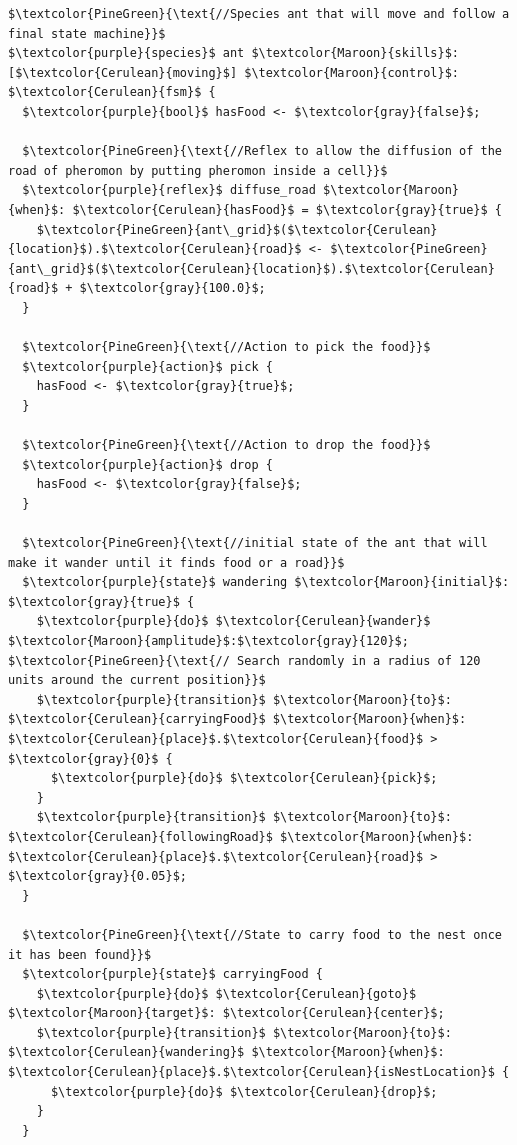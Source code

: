 \documentclass[12pt, a4paper]{memoir} %
\begin{document}
			\begin{lstlisting}[mathescape,caption=Finite State Machine exemple.,label=code:fsm]
$\textcolor{PineGreen}{\text{//Species ant that will move and follow a final state machine}}$
$\textcolor{purple}{species}$ ant $\textcolor{Maroon}{skills}$: [$\textcolor{Cerulean}{moving}$] $\textcolor{Maroon}{control}$: $\textcolor{Cerulean}{fsm}$ {
  $\textcolor{purple}{bool}$ hasFood <- $\textcolor{gray}{false}$;

  $\textcolor{PineGreen}{\text{//Reflex to allow the diffusion of the road of pheromon by putting pheromon inside a cell}}$
  $\textcolor{purple}{reflex}$ diffuse_road $\textcolor{Maroon}{when}$: $\textcolor{Cerulean}{hasFood}$ = $\textcolor{gray}{true}$ {
    $\textcolor{PineGreen}{ant\_grid}$($\textcolor{Cerulean}{location}$).$\textcolor{Cerulean}{road}$ <- $\textcolor{PineGreen}{ant\_grid}$($\textcolor{Cerulean}{location}$).$\textcolor{Cerulean}{road}$ + $\textcolor{gray}{100.0}$;
  }

  $\textcolor{PineGreen}{\text{//Action to pick the food}}$
  $\textcolor{purple}{action}$ pick {
    hasFood <- $\textcolor{gray}{true}$;
  }

  $\textcolor{PineGreen}{\text{//Action to drop the food}}$
  $\textcolor{purple}{action}$ drop {
    hasFood <- $\textcolor{gray}{false}$;
  }

  $\textcolor{PineGreen}{\text{//initial state of the ant that will make it wander until it finds food or a road}}$
  $\textcolor{purple}{state}$ wandering $\textcolor{Maroon}{initial}$: $\textcolor{gray}{true}$ {
    $\textcolor{purple}{do}$ $\textcolor{Cerulean}{wander}$ $\textcolor{Maroon}{amplitude}$:$\textcolor{gray}{120}$; $\textcolor{PineGreen}{\text{// Search randomly in a radius of 120 units around the current position}}$
    $\textcolor{purple}{transition}$ $\textcolor{Maroon}{to}$: $\textcolor{Cerulean}{carryingFood}$ $\textcolor{Maroon}{when}$: $\textcolor{Cerulean}{place}$.$\textcolor{Cerulean}{food}$ > $\textcolor{gray}{0}$ {
      $\textcolor{purple}{do}$ $\textcolor{Cerulean}{pick}$;
    }
    $\textcolor{purple}{transition}$ $\textcolor{Maroon}{to}$: $\textcolor{Cerulean}{followingRoad}$ $\textcolor{Maroon}{when}$: $\textcolor{Cerulean}{place}$.$\textcolor{Cerulean}{road}$ > $\textcolor{gray}{0.05}$;
  }

  $\textcolor{PineGreen}{\text{//State to carry food to the nest once it has been found}}$
  $\textcolor{purple}{state}$ carryingFood {
    $\textcolor{purple}{do}$ $\textcolor{Cerulean}{goto}$ $\textcolor{Maroon}{target}$: $\textcolor{Cerulean}{center}$;
    $\textcolor{purple}{transition}$ $\textcolor{Maroon}{to}$: $\textcolor{Cerulean}{wandering}$ $\textcolor{Maroon}{when}$: $\textcolor{Cerulean}{place}$.$\textcolor{Cerulean}{isNestLocation}$ {
      $\textcolor{purple}{do}$ $\textcolor{Cerulean}{drop}$;
    }
  }


\end{lstlisting}
\end{document}
